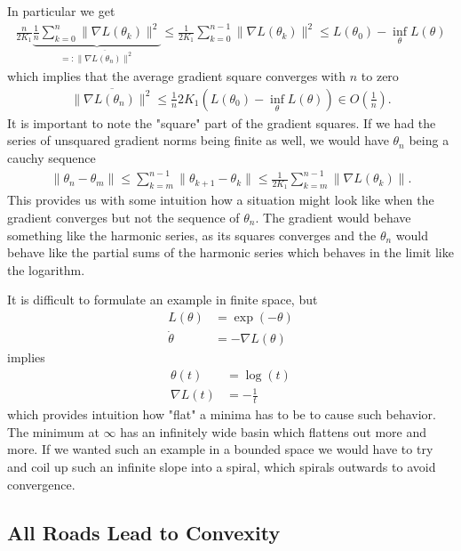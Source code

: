 In particular we get
%
\begin{align*}
	\tfrac{n}{2K_1}
	\underbrace{\tfrac{1}{n} \sum_{k=0}^n \|\nabla L(\theta_k)\|^2}_{
		=: \overline{\|\nabla L(\theta_n)\|^2}
	}
	\le \tfrac{1}{2K_1}\sum_{k=0}^{n-1} \|\nabla L(\theta_k)\|^2 
	\le L(\theta_0) - \inf_\theta L(\theta)
\end{align*}
%
which implies that the average gradient square converges with \(n\) to zero
%
\begin{align*}
	\overline{\|\nabla L(\theta_n)\|^2}
	\le \tfrac{1}{n}2 K_1 (L(\theta_0) - \inf_\theta L(\theta)) \in O(\tfrac{1}{n}).
\end{align*}
%
It is important to note the "square" part of the gradient squares. If we had the
series of unsquared gradient norms being finite as well, we would have
\(\theta_n\) being a cauchy sequence
%
\begin{align*}
	\|\theta_n - \theta_m \|
	\le \sum_{k=m}^{n-1} \|\theta_{k+1} - \theta_k\|
	\le \tfrac{1}{2K_1} \sum_{k=m}^{n-1} \|\nabla L(\theta_k)\|.
\end{align*}
%
This provides us with some intuition how a situation might look like when the
gradient converges but not the sequence of \(\theta_n\). The gradient would
behave something like the harmonic series, as its squares converges and the
\(\theta_n\) would behave like the partial sums of the harmonic series which
behaves in the limit like the logarithm.

It is difficult to formulate an example in finite space, but
%
\begin{align*}
	L(\theta) &= \exp(-\theta) \\
	\dot{\theta} &= -\nabla L(\theta)
\end{align*}
%
implies
%
\begin{align*}
	\theta(t) &= \log(t)\\
	\nabla L(t) &= -\tfrac1t
\end{align*}
%
which provides intuition how "flat" a minima has to be to cause such behavior.
The minimum at \(\infty\) has an infinitely wide basin which flattens out
more and more. If we wanted such an example in a bounded space we would have
to try and coil up such an infinite slope into a spiral, which spirals outwards
to avoid convergence.

\subsection{All Roads Lead to Convexity}

